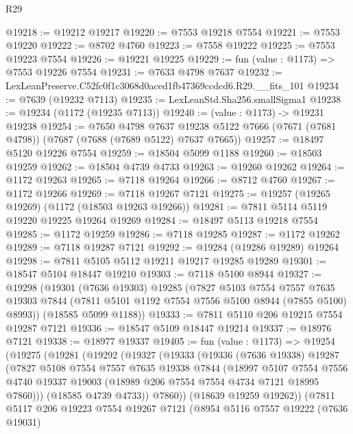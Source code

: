 \begin{lexlean}{R29}
\begin{coremodule}
@19218 := @19212 @19217
@19220 := @7553 @19218 @7554
@19221 := @7553 @19220
@19222 := @8702 @4760
@19223 := @7558 @19222
@19225 := @7553 @19223 @7554
@19226 := @19221 @19225
@19229 := fun (value : @1173) => @7553 @19226 @7554
@19231 := @7633 @4798 @7637
@19232 := LexLeanPreserve.C52fc0f1c3068d0aced1fb47369ccdcd6.R29.__fits_101
@19234 := @7639 (@19232 @7113)
@19235 := LexLeanStd.Sha256.smallSigma1
@19238 := @19234 (@1172 (@19235 @7113))
@19240 := (value : @1173) -> @19231 @19238
@19254 := @7650
    @4798
    @7637
    @19238
    @5122
    @7666
    (@7671 (@7681 @4798))
    (@7687 (@7688 (@7689 @5122) @7637 @7665))
@19257 := @18497 @5120 @19226 @7554
@19259 := @18504 @5099 @1188
@19260 := @18503 @19259
@19262 := @18504 @4739 @4733
@19263 := @19260 @19262
@19264 := @1172 @19263
@19265 := @7118 @19264
@19266 := @8712 @4760
@19267 := @1172 @19266
@19269 := @7118 @19267 @7121
@19275 := @19257 (@19265 @19269) (@1172 (@18503 @19263 @19266))
@19281 := @7811 @5114 @5119 @19220 @19225 @19264 @19269
@19284 := @18497 @5113 @19218 @7554
@19285 := @1172 @19259
@19286 := @7118 @19285
@19287 := @1172 @19262
@19289 := @7118 @19287 @7121
@19292 := @19284 (@19286 @19289) @19264
@19298 := @7811 @5105 @5112 @19211 @19217 @19285 @19289
@19301 := @18547 @5104 @18447 @19210
@19303 := @7118 @5100 @8944
@19327 := @19298
    (@19301
      (@7636 @19303)
      @19285
      (@7827
        @5103
        @7554
        @7557
        @7635
        @19303
        @7844
        (@7811 @5101 @1192 @7554 @7556 @5100 @8944 (@7855 @5100) @8993))
      (@18585 @5099 @1188))
@19333 := @7811 @5110 @206 @19215 @7554 @19287 @7121
@19336 := @18547 @5109 @18447 @19214
@19337 := @18976 @7121
@19338 := @18977 @19337
@19405 := fun (value : @1173) =>
  @19254
    (@19275
      (@19281
        (@19292
          (@19327
            (@19333
              (@19336
                (@7636 @19338)
                @19287
                (@7827
                  @5108
                  @7554
                  @7557
                  @7635
                  @19338
                  @7844
                  (@18997
                    @5107
                    @7554
                    @7556
                    @4740
                    @19337
                    @19003
                    (@18989 @206 @7554 @7554 @4734 @7121 @18995 @7860)))
                (@18585 @4739 @4733))
              @7860))
          (@18639 @19259 @19262))
        (@7811
          @5117
          @206
          @19223
          @7554
          @19267
          @7121
          (@8954
            @5116
            @7557
            @19222
            (@7636 @19031)

\end{coremodule}
\end{lexlean}
